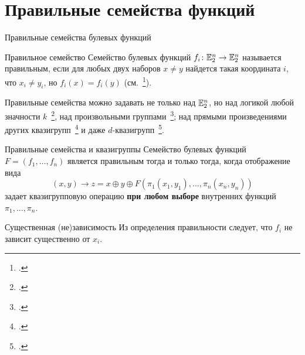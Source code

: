 \section{Правильные семейства функций}


\begin{frame}{Правильные семейства булевых функций}
    \begin{myexample}{Правильное семейство}
        Семейство булевых функций $f_i \colon \mathbb{E}_2^n \to \mathbb{E}_2^n$ называется правильным, если для любых двух наборов $x \ne y$ найдется такая координата $i$, что $x_i \ne y_i$, но $f_i(x) = f_i(y)$ (см.~\footcite{nosov98, nosov99}).
    \end{myexample}
    \pause 

    Правильные семейства можно задавать не только над $\mathbb{E}_2^n$, но над логикой любой значности $k$~\footcite{nosov06}, над произвольными группами~\footcite{nosov06abel}; над прямыми произведениями других квазигрупп~\footcite{galatenko2020latin} и даже $d$-квазигрупп~\footcite{plaksina14}.
\end{frame}


\begin{frame}{Правильные семейства и квазигруппы}
    Семейство булевых функций $F = (f_1, \ldots, f_n)$ является правильным тогда и только тогда, когда отображение вида 
    \[
        (x, y) \to z = x \oplus y \oplus F(\pi_1(x_1, y_1), \ldots, \pi_n(x_n, y_n))
    \]
    задает квазигрупповую операцию \textbf{при любом выборе} внутренних функций $\pi_1, \ldots, \pi_n$.

    \pause 
    \begin{mypropos}{Существенная (не)зависимость}
        Из определения правильности следует, что $f_i$ не зависит существенно от $x_i$.
    \end{mypropos}
\end{frame}


